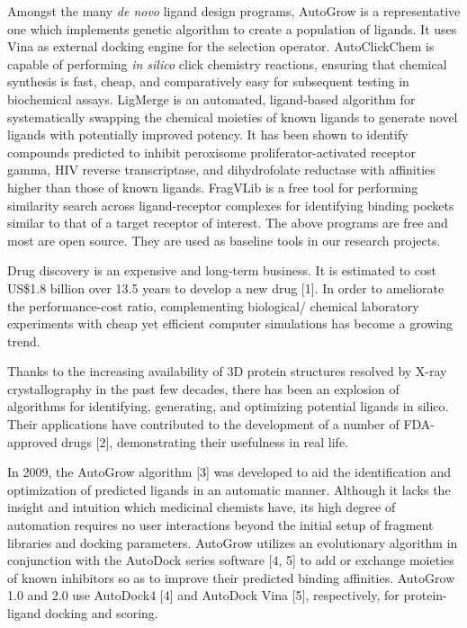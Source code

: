 Amongst the many \textit{de novo} ligand design programs, AutoGrow \citep{466} is a representative one which implements genetic algorithm to create a population of ligands. It uses Vina \citep{595} as external docking engine for the selection operator. AutoClickChem \citep{1051} is capable of performing \textit{in silico} click chemistry reactions, ensuring that chemical synthesis is fast, cheap, and comparatively easy for subsequent testing in biochemical assays. LigMerge \citep{1181} is an automated, ligand-based algorithm for systematically swapping the chemical moieties of known ligands to generate novel ligands with potentially improved potency. It has been shown to identify compounds predicted to inhibit peroxisome proliferator-activated receptor gamma, HIV reverse transcriptase, and dihydrofolate reductase with affinities higher than those of known ligands. FragVLib \citep{1247} is a free tool for performing similarity search across ligand-receptor complexes for identifying binding pockets similar to that of a target receptor of interest. The above programs are free and most are open source. They are used as baseline tools in our research projects.

Drug discovery is an expensive and long-term business. It is estimated to cost US\$1.8 billion over 13.5 years to develop a new drug [1]. In order to ameliorate the performance-cost ratio, complementing biological/ chemical laboratory experiments with cheap yet efficient computer simulations has become a growing trend.

Thanks to the increasing availability of 3D protein structures resolved by X-ray crystallography in the past few decades, there has been an explosion of algorithms for identifying, generating, and optimizing potential ligands in silico. Their applications have contributed to the development of a number of FDA-approved drugs [2], demonstrating their usefulness in real life.

In 2009, the AutoGrow algorithm [3] was developed to aid the identification and optimization of predicted ligands in an automatic manner. Although it lacks the insight and intuition which medicinal chemists have, its high degree of automation requires no user interactions beyond the initial setup of fragment libraries and docking parameters. AutoGrow utilizes an evolutionary algorithm in conjunction with the AutoDock series software [4, 5] to add or exchange moieties of known inhibitors so as to improve their predicted binding affinities. AutoGrow 1.0 and 2.0 use AutoDock4 [4] and AutoDock Vina [5], respectively, for protein-ligand docking and scoring.

